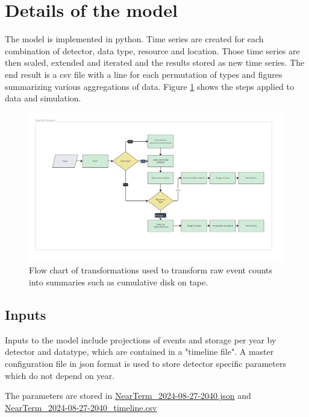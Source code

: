 \documentclass[12pt]{article}
\begin{document}
   
     
  \section{Details of the model}
  
  The model is implemented in python.  Time series are created for each combination of detector, data type, resource and location.  Those time series are then  scaled, extended and iterated and the results stored as new time series.  The end result is a csv file with a line for each permutation of types and figures summarizing various aggregations of data. Figure \ref{fig:Flowchart} shows the steps applied to data and simulation. 
  
  \begin{figure}[ht]
\centering
\includegraphics[width=0.99 \textwidth]{Flowchart.pdf}
\caption{Flow chart of transformations used to transform raw event counts into summaries such as cumulative disk on tape. }
\label{fig:Flowchart}
\end{figure} 
  
  \subsection{Inputs}
  
 Inputs to the model include projections of events and storage per year by detector and datatype, which are contained in a "timeline file".  A master configuration file in json format is used to store detector specific parameters which do not depend on year. 
 
 The parameters are stored in \href{https://github.com/DUNE/CCB-data/blob/CCB-Jun24/model-2024/NearTerm_2024-08-27-2040.json}{NearTerm\_2024-08-27-2040.json} and  \href{https://github.com/DUNE/CCB-data/blob/CCB-Jun24/model-2024/NearTerm_2024-08-27-2040_timeline.csv}{NearTerm\_2024-08-27-2040\_timeline.csv}
 
\end{document}
